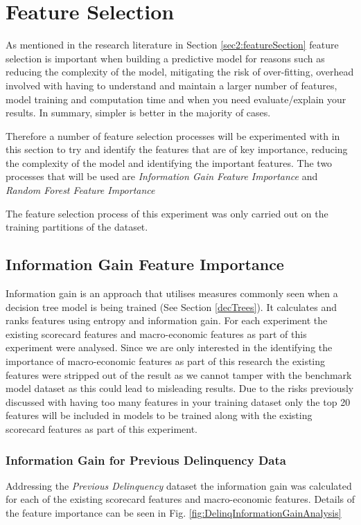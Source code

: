 \section{Feature Selection}
As mentioned in the research literature in Section \ref{sec2:featureSection} feature selection is important when building a predictive model for reasons such as reducing the complexity of the model, mitigating the risk of over-fitting, overhead involved with having to understand and maintain a larger number of features, model training and computation time and when you need evaluate/explain your results. In summary, simpler is better in the majority of cases.

Therefore a number of feature selection processes will be experimented with in this section to try and identify the features that are of key importance, reducing the complexity of the model and identifying the important features. The two processes that will be used are \textit{Information Gain Feature Importance} and \textit{Random Forest Feature Importance}

The feature selection process of this experiment was only carried out on the training partitions of the dataset.

\subsection{Information Gain Feature Importance}
Information gain is an approach that utilises measures commonly seen when a decision tree model is being trained (See Section \ref{decTrees}). It calculates and ranks features using entropy and information gain. For each experiment the existing scorecard features and macro-economic features as part of this experiment were analysed. Since we are only interested in the identifying the importance of macro-economic features as part of this research the existing features were stripped out of the result as we cannot tamper with the benchmark model dataset as this could lead to misleading results. Due to the risks previously discussed with having too many features in your training dataset only the top 20 features will be included in models to be trained along with the existing scorecard features as part of this experiment.

\subsubsection{Information Gain for Previous Delinquency Data} \label{IGPDExper}
Addressing the \textit{Previous Delinquency} dataset the information gain was calculated for each of the existing scorecard features and macro-economic features. Details of the feature importance can be seen in Fig. \ref{fig:DelinqInformationGainAnalysis}

